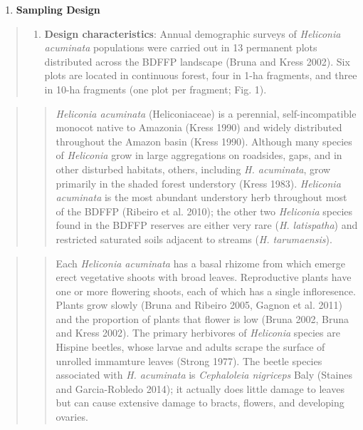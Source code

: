 \documentclass[
  12pt,
  man, donotrepeattitle,floatsintext]{apa6}
\providecommand{\tightlist}{%
  \setlength{\itemsep}{0pt}\setlength{\parskip}{0pt}}
\begin{document}
\begin{enumerate}
\def\labelenumi{\arabic{enumi}.}
\setcounter{enumi}{1}
\tightlist
\item
  \textbf{Sampling Design}
\end{enumerate}

\begin{quote}
\begin{enumerate}
\def\labelenumi{\alph{enumi}.}
\tightlist
\item
  \textbf{Design characteristics}: Annual demographic surveys of \emph{Heliconia acuminata} populations were carried out in 13 permanent plots distributed across the BDFFP landscape (Bruna and Kress 2002). Six plots are located in continuous forest, four in 1-ha fragments, and three in 10-ha fragments (one plot per fragment; Fig. 1).
\end{enumerate}
\end{quote}

\begin{quote}
\begin{quote}
\emph{Heliconia acuminata} (Heliconiaceae) is a perennial, self-incompatible monocot native to Amazonia (Kress 1990) and widely distributed throughout the Amazon basin (Kress 1990). Although many species of \emph{Heliconia} grow in large aggregations on roadsides, gaps, and in other disturbed habitats, others, including \emph{H. acuminata}, grow primarily in the shaded forest understory (Kress 1983). \emph{Heliconia acuminata} is the most abundant understory herb throughout most of the BDFFP (Ribeiro et al. 2010); the other two \emph{Heliconia} species found in the BDFFP reserves are either very rare (\emph{H. latispatha}) and restricted saturated soils adjacent to streams (\emph{H. tarumaensis}).
\end{quote}
\end{quote}

\begin{quote}
\begin{quote}
Each \emph{Heliconia acuminata} has a basal rhizome from which emerge erect vegetative shoots with broad leaves. Reproductive plants have one or more flowering shoots, each of which has a single infloresence. Plants grow slowly (Bruna and Ribeiro 2005, Gagnon et al. 2011) and the proportion of plants that flower is low (Bruna 2002, Bruna and Kress 2002). The primary herbivores of \emph{Heliconia} species are Hispine beetles, whose larvae and adults scrape the surface of unrolled immamture leaves (Strong 1977). The beetle species associated with \emph{H. acuminata} is \emph{Cephaloleia nigriceps} Baly (Staines and Garcia-Robledo 2014); it actually does little damage to leaves but can cause extensive damage to bracts, flowers, and developing ovaries.
\end{quote}
\end{quote}
\end{document}
